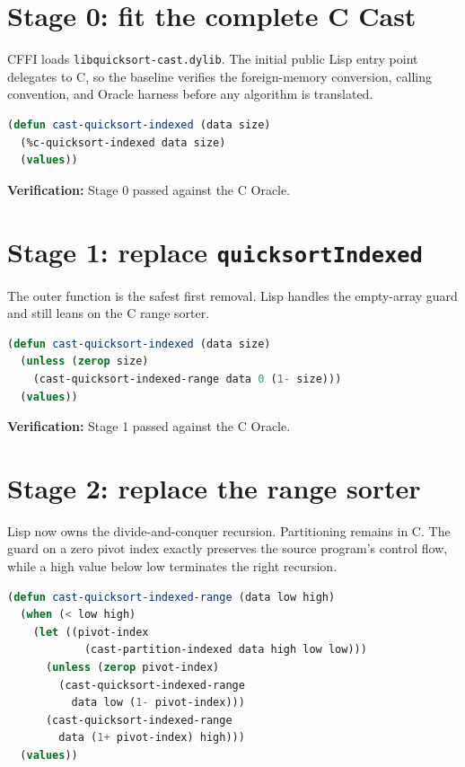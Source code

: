 \documentclass[fontsize=16pt]{scrartcl}
\begin{document}
\section*{Stage 0: fit the complete C Cast}

CFFI loads \texttt{libquicksort-cast.dylib}.  The initial public Lisp entry
point delegates to C, so the baseline verifies the foreign-memory conversion,
calling convention, and Oracle harness before any algorithm is translated.

\begin{lstlisting}[language=Lisp]
(defun cast-quicksort-indexed (data size)
  (%c-quicksort-indexed data size)
  (values))
\end{lstlisting}

\textbf{Verification:} Stage 0 passed against the C Oracle.

\section*{Stage 1: replace \texttt{quicksortIndexed}}

The outer function is the safest first removal.  Lisp handles the empty-array
guard and still leans on the C range sorter.

\begin{lstlisting}[language=Lisp]
(defun cast-quicksort-indexed (data size)
  (unless (zerop size)
    (cast-quicksort-indexed-range data 0 (1- size)))
  (values))
\end{lstlisting}

\textbf{Verification:} Stage 1 passed against the C Oracle.

\section*{Stage 2: replace the range sorter}

Lisp now owns the divide-and-conquer recursion.  Partitioning remains in C.
The guard on a zero pivot index exactly preserves the source program's control
flow, while a high value below low terminates the right recursion.

\begin{lstlisting}[language=Lisp]
(defun cast-quicksort-indexed-range (data low high)
  (when (< low high)
    (let ((pivot-index
            (cast-partition-indexed data high low low)))
      (unless (zerop pivot-index)
        (cast-quicksort-indexed-range
          data low (1- pivot-index)))
      (cast-quicksort-indexed-range
        data (1+ pivot-index) high)))
  (values))
\end{lstlisting}
\end{document}
